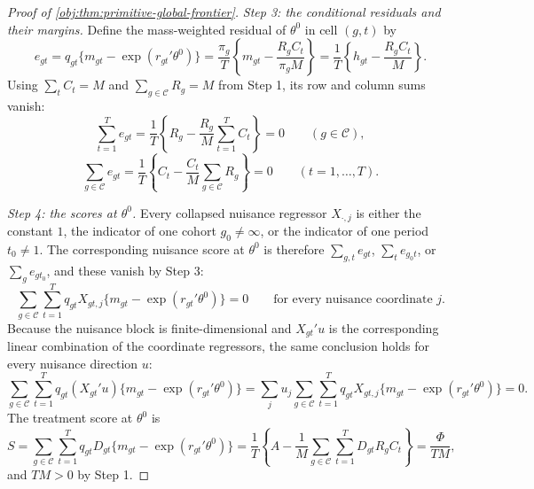 \begin{proof}[Proof of \cref{obj:thm:primitive-global-frontier}]
\textit{Step 3: the conditional residuals and their margins.} Define the mass-weighted residual of \(\theta^0\) in cell \((g,t)\) by
\[
e_{gt}
=q_{gt}\{m_{gt}-\exp(r_{gt}'\theta^0)\}
=\frac{\pi_g}{T}\left\{m_{gt}-\frac{R_gC_t}{\pi_gM}\right\}
=\frac{1}{T}\left\{h_{gt}-\frac{R_gC_t}{M}\right\}.
\]
Using \(\sum_tC_t=M\) and \(\sum_{g\in\mathcal C}R_g=M\) from Step 1, its row and column sums vanish:
\[
\sum_{t=1}^T e_{gt}=\frac{1}{T}\left\{R_g-\frac{R_g}{M}\sum_{t=1}^TC_t\right\}=0
\qquad(g\in\mathcal C),
\]
\[
\sum_{g\in\mathcal C} e_{gt}=\frac{1}{T}\left\{C_t-\frac{C_t}{M}\sum_{g\in\mathcal C}R_g\right\}=0
\qquad(t=1,\ldots,T).
\]

\textit{Step 4: the scores at \(\theta^0\).} Every collapsed nuisance regressor \(X_{\cdot,j}\) is either the constant \(1\), the indicator of one cohort \(g_0\neq\infty\), or the indicator of one period \(t_0\neq1\). The corresponding nuisance score at \(\theta^0\) is therefore \(\sum_{g,t}e_{gt}\), \(\sum_te_{g_0t}\), or \(\sum_ge_{gt_0}\), and these vanish by Step 3:
\[
\sum_{g\in\mathcal C}\sum_{t=1}^T
q_{gt}X_{gt,j}\{m_{gt}-\exp(r_{gt}'\theta^0)\}=0
\qquad\text{for every nuisance coordinate }j .
\]
Because the nuisance block is finite-dimensional and \(X_{gt}'u\) is the corresponding linear combination of the coordinate regressors, the same conclusion holds for every nuisance direction \(u\):
\[
\sum_{g\in\mathcal C}\sum_{t=1}^T
q_{gt}(X_{gt}'u)\{m_{gt}-\exp(r_{gt}'\theta^0)\}
=
\sum_j u_j
\sum_{g\in\mathcal C}\sum_{t=1}^T
q_{gt}X_{gt,j}\{m_{gt}-\exp(r_{gt}'\theta^0)\}
=0 .
\]
The treatment score at \(\theta^0\) is
\[
S
=
\sum_{g\in\mathcal C}\sum_{t=1}^T
q_{gt}D_{gt}\{m_{gt}-\exp(r_{gt}'\theta^0)\}
=
\frac{1}{T}\left\{A-\frac{1}{M}\sum_{g\in\mathcal C}\sum_{t=1}^T D_{gt}R_gC_t\right\}
=
\frac{\Phi}{TM},
\]
and \(TM>0\) by Step 1.


\end{proof}
